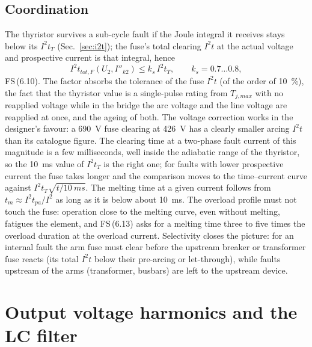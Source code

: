 \documentclass[10pt,a4paper]{scrartcl}
\newcommand{\iit}{I^{2}t}
\newcommand{\fs}[1]{\textsf{FS}\,(#1)}
\begin{document}
\subsection{Coordination}
The thyristor survives a sub-cycle fault if the Joule integral it receives stays below its $\iit_T$ (Sec.~\ref{sec:i2t}); the fuse's total clearing $\iit$ at the actual voltage and prospective current is that integral, hence
\begin{equation}
\iit_{tot,F}(U_2, I''_{k2}) \le k_s\,\iit_T, \qquad k_s = 0.7\ldots0.8 ,
\label{eq:coordderiv}
\end{equation}
\fs{6.10}. The factor absorbs the tolerance of the fuse $\iit$ (of the order of \SI{10}{\percent}), the fact that the thyristor value is a single-pulse rating from $T_{j,max}$ with no reapplied voltage while in the bridge the arc voltage and the line voltage are reapplied at once, and the ageing of both. The voltage correction works in the designer's favour: a \SI{690}{V} fuse clearing at \SI{426}{V} has a clearly smaller arcing $\iit$ than its catalogue figure. The clearing time at a two-phase fault current of this magnitude is a few milliseconds, well inside the adiabatic range of the thyristor, so the \SI{10}{ms} value of $\iit_T$ is the right one; for faults with lower prospective current the fuse takes longer and the comparison moves to the time--current curve against $\iit_T\sqrt{t/\SI{10}{ms}}$. The melting time at a given current follows from $t_m\approx\iit_{pa}/I^2$ as long as it is below about \SI{10}{ms}. The overload profile must not touch the fuse: operation close to the melting curve, even without melting, fatigues the element, and \fs{6.13} asks for a melting time three to five times the overload duration at the overload current. Selectivity closes the picture: for an internal fault the arm fuse must clear before the upstream breaker or transformer fuse reacts (its total $\iit$ below their pre-arcing or let-through), while faults upstream of the arms (transformer, busbars) are left to the upstream device.

\section{Output voltage harmonics and the LC filter}\label{sec:filter}
\end{document}
